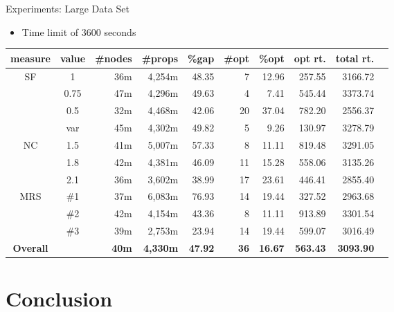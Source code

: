 \documentclass{beamer}
\begin{document}
\begin{frame}{Experiments: Large Data Set}
	\begin{itemize}
		\item Time limit of 3600 seconds \pause
	\end{itemize}
	\begin{table}[H]
		\begin{adjustwidth}{-.9in}{-.9in}
			\centering
			\scriptsize
			\vspace{2mm}
			\begin{tabular}{cc|rrrrrrrr}
				\hline
				measure & value  & \#nodes & \#props & \%gap & \#opt & \%opt & opt rt. &  total rt. \\
				\hline SF & 1 & 36m & 4,254m & 48.35 & 7 & 12.96 & 257.55 & 3166.72 \\
				 & 0.75 & 47m & 4,296m & 49.63 & 4 & 7.41 & 545.44 & 3373.74 \\
				 & 0.5 & 32m & 4,468m & 42.06 & 20 & 37.04 & 782.20 & 2556.37 \\
				 & var & 45m & 4,302m & 49.82 & 5 & 9.26 & 130.97 & 3278.79 \\\hline
				NC & 1.5 & 41m & 5,007m & 57.33 & 8 & 11.11 & 819.48 & 3291.05 \\
				 & 1.8 & 42m & 4,381m & 46.09 & 11 & 15.28 & 558.06 & 3135.26 \\
				 & 2.1 & 36m & 3,602m & 38.99 & 17 & 23.61 & 446.41 & 2855.40 \\\hline
				MRS & \#1 & 37m & 6,083m & 76.93 & 14 & 19.44 & 327.52 & 2963.68 \\
				 & \#2 & 42m & 4,154m & 43.36 & 8 & 11.11 & 913.89 & 3301.54 \\
				 & \#3 & 39m & 2,753m & 23.94 & 14 & 19.44 & 599.07 & 3016.49 \\\hline
				\hline \bf{Overall} &  & \bf{40m} & \bf{4,330m} & \bf{47.92} & \alert{\bf{36}} & \bf{16.67} & \bf{563.43} & \bf{3093.90} \\\hline\hline
			\end{tabular}
		\end{adjustwidth}
	\end{table}
\end{frame}

\section{Conclusion}
\end{document}
